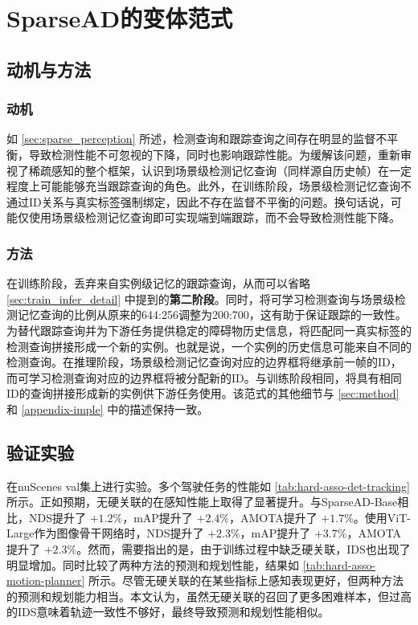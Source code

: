 \section{SparseAD的变体范式}
\label{appendix-variant}
\subsection{动机与方法}

\subsubsection{动机}

如 \cref{sec:sparse_perception} 所述，检测查询和跟踪查询之间存在明显的监督不平衡，导致检测性能不可忽视的下降，同时也影响跟踪性能。为缓解该问题，重新审视了稀疏感知的整个框架，认识到场景级检测记忆查询（同样源自历史帧）在一定程度上可能能够充当跟踪查询的角色。此外，在训练阶段，场景级检测记忆查询不通过ID关系与真实标签强制绑定，因此不存在监督不平衡的问题。换句话说，可能仅使用场景级检测记忆查询即可实现端到端跟踪，而不会导致检测性能下降。

\subsubsection{方法}

在训练阶段，丢弃来自实例级记忆的跟踪查询，从而可以省略 \cref{sec:train_infer_detail} 中提到的\textbf{第二阶段}。同时，将可学习检测查询与场景级检测记忆查询的比例从原来的644:256调整为200:700，这有助于保证跟踪的一致性。为替代跟踪查询并为下游任务提供稳定的障碍物历史信息，将匹配同一真实标签的检测查询拼接形成一个新的实例。也就是说，一个实例的历史信息可能来自不同的检测查询。在推理阶段，场景级检测记忆查询对应的边界框将继承前一帧的ID，而可学习检测查询对应的边界框将被分配新的ID。与训练阶段相同，将具有相同ID的查询拼接形成新的实例供下游任务使用。该范式的其他细节与 \cref{sec:method} 和 \cref{appendix-imple} 中的描述保持一致。

\subsection{验证实验}
在nuScenes val集上进行实验。多个驾驶任务的性能如 \cref{tab:hard-asso-det-tracking} 所示。正如预期，无硬关联的\model 在感知性能上取得了显著提升。与SparseAD-Base相比，NDS提升了 $+1.2\%$，mAP提升了 $+2.4\%$，AMOTA提升了 $+1.7\%$。使用ViT-Large作为图像骨干网络时，NDS提升了 $+2.3\%$，mAP提升了 $+3.7\%$，AMOTA提升了 $+2.3\%$。然而，需要指出的是，由于训练过程中缺乏硬关联，IDS也出现了明显增加。同时比较了两种方法的预测和规划性能，结果如 \cref{tab:hard-asso-motion-planner} 所示。尽管无硬关联的\model 在某些指标上感知表现更好，但两种方法的预测和规划能力相当。本文认为，虽然无硬关联的\model 召回了更多困难样本，但过高的IDS意味着轨迹一致性不够好，最终导致预测和规划性能相似。


